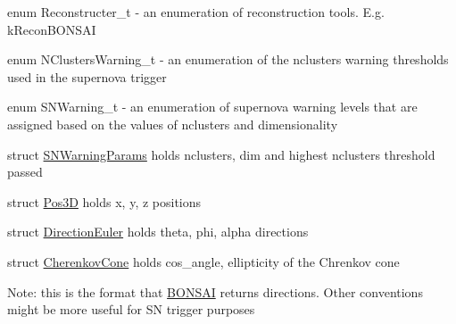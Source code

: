 \begin{DoxyItemize}
\item {\ttfamily enum Reconstructer\-\_\-t} -\/ an enumeration of reconstruction tools. E.\-g. {\ttfamily k\-Recon\-B\-O\-N\-S\-A\-I}
\item {\ttfamily enum N\-Clusters\-Warning\-\_\-t} -\/ an enumeration of the nclusters warning thresholds used in the supernova trigger
\item {\ttfamily enum S\-N\-Warning\-\_\-t} -\/ an enumeration of supernova warning levels that are assigned based on the values of nclusters and dimensionality
\item {\ttfamily struct \hyperlink{structSNWarningParams}{S\-N\-Warning\-Params}} holds nclusters, dim and highest nclusters threshold passed
\item {\ttfamily struct \hyperlink{structPos3D}{Pos3\-D}} holds x, y, z positions
\item {\ttfamily struct \hyperlink{structDirectionEuler}{Direction\-Euler}} holds theta, phi, alpha directions
\item {\ttfamily struct \hyperlink{structCherenkovCone}{Cherenkov\-Cone}} holds cos\-\_\-angle, ellipticity of the Chrenkov cone
\end{DoxyItemize}

Note\-: this is the format that \hyperlink{classBONSAI}{B\-O\-N\-S\-A\-I} returns directions. Other conventions might be more useful for S\-N trigger purposes 